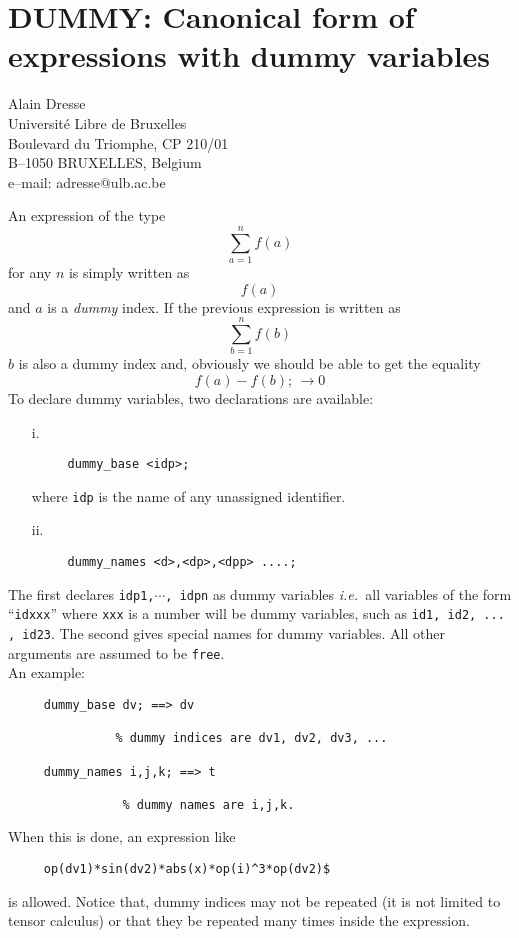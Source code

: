 \chapter[DUMMY: Expressions with dummy vars]%
        {DUMMY: Canonical form of expressions with dummy variables}
\label{DUMMY}

{\footnotesize
\begin{center}
Alain Dresse \\
Universit\'e Libre de Bruxelles \\
Boulevard du Triomphe, CP 210/01 \\
B--1050 BRUXELLES, Belgium \\[0.05in]
e--mail: adresse@ulb.ac.be
\end{center}
}


An expression of the type
$$
\sum_{a=1}^{n} f(a)
$$
for any $n$ is  simply written as
$$
f(a)
$$
and $a$ is a {\em dummy} index.
If the previous expression is written as
$$
\sum_{b=1}^{n} f(b)
$$
$b$ is also a dummy index and, obviously we should be able to get the
equality
$$
f(a)-f(b);\, \rightarrow  0
$$
To declare dummy variables, two declarations are
available:
\begin{itemize}
\item[i.]
\begin{verbatim}
     dummy_base <idp>;
\end{verbatim}
where {\tt idp} is the name of any unassigned identifier.
\item[ii.]
\begin{verbatim}
     dummy_names <d>,<dp>,<dpp> ....;
\end{verbatim}
\end{itemize}
The first declares {\tt idp1,$\cdots$, idpn} as dummy variables {\em
i.e.\ }all variables of the form ``{\tt idxxx}'' where {\tt xxx} is a
number will be dummy variables, such as {\tt id1, id2, ... , id23}.
The second gives special names for dummy variables.
All other arguments are assumed to be {\tt free}.\\
An example:
\begin{verbatim}
     dummy_base dv; ==> dv

               % dummy indices are dv1, dv2, dv3, ...

     dummy_names i,j,k; ==> t

                % dummy names are i,j,k.

\end{verbatim}
When this is done, an expression like
\begin{verbatim}
     op(dv1)*sin(dv2)*abs(x)*op(i)^3*op(dv2)$
\end{verbatim}
is allowed.  Notice that, dummy indices may not be repeated (it is not
limited to tensor calculus) or that they be repeated many times inside
the expression.

